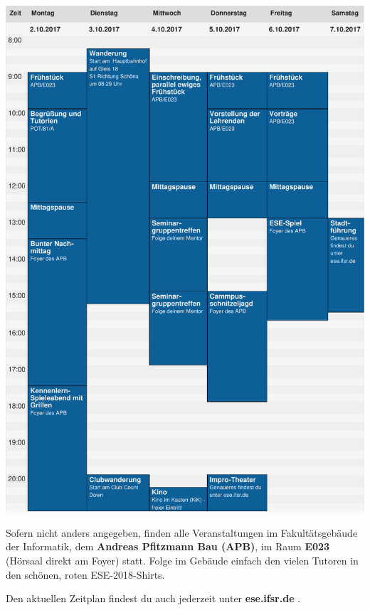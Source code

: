 \begin{center}
  \vspace*{-6.5em}
  \includegraphics[height=.77\dimen108,keepaspectratio]{img/zeitplan.pdf}%
  
  \small
  \vfill
  \enlargethispage{3em}
  
  Sofern nicht anders angegeben, finden alle Veranstaltungen im Fakultätsgebäude der Informatik, dem
  \textbf{Andreas Pfitzmann Bau (APB)}, im Raum \textbf{E023} (Hörsaal direkt am Foyer) statt.
  Folge im Gebäude einfach den vielen Tutoren in den schönen, roten ESE-2018-Shirts.

  Den aktuellen Zeitplan findest du auch jederzeit unter \textbf{ese.ifsr.de} .
\end{center}
